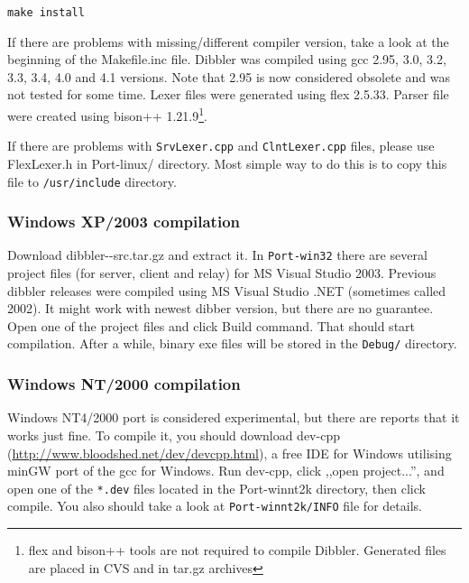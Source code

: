 \begin{verbatim}
make install
\end{verbatim}

If there are problems with missing/different compiler
version, take a look at the beginning of the Makefile.inc
file. Dibbler was compiled using gcc 2.95, 3.0, 3.2, 3.3, 3.4, 4.0 and 4.1
versions. Note that 2.95 is now considered obsolete and was not tested
for some time. Lexer files were generated using flex 2.5.33. Parser file
were created using bison++ 1.21.9\footnote{flex and bison++ tools are
  not required to compile Dibbler. Generated files are placed in CVS
  and in tar.gz archives}. 

If there are problems with \verb+SrvLexer.cpp+ and
\verb+ClntLexer.cpp+ files, please use FlexLexer.h in Port-linux/
directory. Most simple way to do this is to copy this file to
\verb+/usr/include+ directory. 

\subsubsection{Windows XP/2003 compilation}
Download dibbler-\version-src.tar.gz and extract it. In \verb+Port-win32+ there
are several project files (for server, client and relay) for MS
Visual Studio 2003. Previous dibbler releases were compiled using MS
Visual Studio .NET (sometimes called 2002). It might work with newest
dibber version, but there are no guarantee. Open one of the project
files and click Build command. That should start compilation. After a
while, binary exe files will be stored in the \verb+Debug/+ directory.

\subsubsection{Windows NT/2000 compilation}
Windows NT4/2000 port is considered experimental, but there are reports
that it works just fine. To compile it, you should download dev-cpp
(\url{http://www.bloodshed.net/dev/devcpp.html}), a free IDE for
Windows utilising minGW port of the gcc for Windows. Run dev-cpp,
click ,,open project...'', and open one of the \verb+*.dev+ files located
in the Port-winnt2k directory, then click compile. You also should
take a look at \verb+Port-winnt2k/INFO+ file for details.

